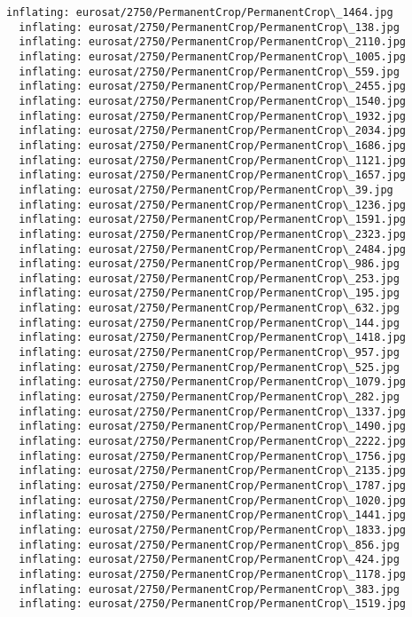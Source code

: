 \documentclass[11pt]{article}
\begin{document}
\begin{Verbatim}[commandchars=\\\{\}]
  inflating: eurosat/2750/PermanentCrop/PermanentCrop\_1464.jpg
  inflating: eurosat/2750/PermanentCrop/PermanentCrop\_138.jpg
  inflating: eurosat/2750/PermanentCrop/PermanentCrop\_2110.jpg
  inflating: eurosat/2750/PermanentCrop/PermanentCrop\_1005.jpg
  inflating: eurosat/2750/PermanentCrop/PermanentCrop\_559.jpg
  inflating: eurosat/2750/PermanentCrop/PermanentCrop\_2455.jpg
  inflating: eurosat/2750/PermanentCrop/PermanentCrop\_1540.jpg
  inflating: eurosat/2750/PermanentCrop/PermanentCrop\_1932.jpg
  inflating: eurosat/2750/PermanentCrop/PermanentCrop\_2034.jpg
  inflating: eurosat/2750/PermanentCrop/PermanentCrop\_1686.jpg
  inflating: eurosat/2750/PermanentCrop/PermanentCrop\_1121.jpg
  inflating: eurosat/2750/PermanentCrop/PermanentCrop\_1657.jpg
  inflating: eurosat/2750/PermanentCrop/PermanentCrop\_39.jpg
  inflating: eurosat/2750/PermanentCrop/PermanentCrop\_1236.jpg
  inflating: eurosat/2750/PermanentCrop/PermanentCrop\_1591.jpg
  inflating: eurosat/2750/PermanentCrop/PermanentCrop\_2323.jpg
  inflating: eurosat/2750/PermanentCrop/PermanentCrop\_2484.jpg
  inflating: eurosat/2750/PermanentCrop/PermanentCrop\_986.jpg
  inflating: eurosat/2750/PermanentCrop/PermanentCrop\_253.jpg
  inflating: eurosat/2750/PermanentCrop/PermanentCrop\_195.jpg
  inflating: eurosat/2750/PermanentCrop/PermanentCrop\_632.jpg
  inflating: eurosat/2750/PermanentCrop/PermanentCrop\_144.jpg
  inflating: eurosat/2750/PermanentCrop/PermanentCrop\_1418.jpg
  inflating: eurosat/2750/PermanentCrop/PermanentCrop\_957.jpg
  inflating: eurosat/2750/PermanentCrop/PermanentCrop\_525.jpg
  inflating: eurosat/2750/PermanentCrop/PermanentCrop\_1079.jpg
  inflating: eurosat/2750/PermanentCrop/PermanentCrop\_282.jpg
  inflating: eurosat/2750/PermanentCrop/PermanentCrop\_1337.jpg
  inflating: eurosat/2750/PermanentCrop/PermanentCrop\_1490.jpg
  inflating: eurosat/2750/PermanentCrop/PermanentCrop\_2222.jpg
  inflating: eurosat/2750/PermanentCrop/PermanentCrop\_1756.jpg
  inflating: eurosat/2750/PermanentCrop/PermanentCrop\_2135.jpg
  inflating: eurosat/2750/PermanentCrop/PermanentCrop\_1787.jpg
  inflating: eurosat/2750/PermanentCrop/PermanentCrop\_1020.jpg
  inflating: eurosat/2750/PermanentCrop/PermanentCrop\_1441.jpg
  inflating: eurosat/2750/PermanentCrop/PermanentCrop\_1833.jpg
  inflating: eurosat/2750/PermanentCrop/PermanentCrop\_856.jpg
  inflating: eurosat/2750/PermanentCrop/PermanentCrop\_424.jpg
  inflating: eurosat/2750/PermanentCrop/PermanentCrop\_1178.jpg
  inflating: eurosat/2750/PermanentCrop/PermanentCrop\_383.jpg
  inflating: eurosat/2750/PermanentCrop/PermanentCrop\_1519.jpg

\end{Verbatim}
\end{document}
